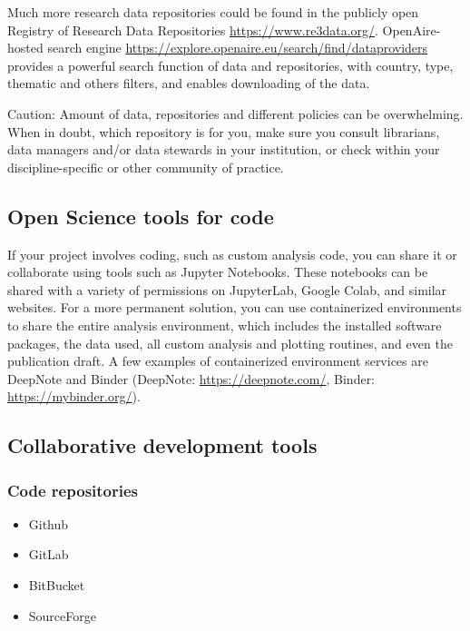 \documentclass[
  letterpaper,
  DIV=11,
  numbers=noendperiod]{scrreport}
\providecommand{\tightlist}{%
  \setlength{\itemsep}{0pt}\setlength{\parskip}{0pt}}\usepackage{longtable,booktabs,array}
\begin{document}
Much more research data repositories could be found in the publicly open
Registry of Research Data Repositories \url{https://www.re3data.org/}.
OpenAire-hosted search engine
\url{https://explore.openaire.eu/search/find/dataproviders} provides a
powerful search function of data and repositories, with country, type,
thematic and others filters, and enables downloading of the data.

Caution: Amount of data, repositories and different policies can be
overwhelming. When in doubt, which repository is for you, make sure you
consult librarians, data managers and/or data stewards in your
institution, or check within your discipline-specific or other community
of practice.

\hypertarget{open-science-tools-for-code}{%
\subsection{Open Science tools for
code}\label{open-science-tools-for-code}}

If your project involves coding, such as custom analysis code, you can
share it or collaborate using tools such as Jupyter Notebooks. These
notebooks can be shared with a variety of permissions on JupyterLab,
Google Colab, and similar websites. For a more permanent solution, you
can use containerized environments to share the entire analysis
environment, which includes the installed software packages, the data
used, all custom analysis and plotting routines, and even the
publication draft. A few examples of containerized environment services
are DeepNote and Binder (DeepNote: \url{https://deepnote.com/}, Binder:
\url{https://mybinder.org/}).

\hypertarget{collaborative-development-tools}{%
\subsection{Collaborative development
tools}\label{collaborative-development-tools}}

\hypertarget{code-repositories}{%
\subsubsection{Code repositories}\label{code-repositories}}

\begin{itemize}
\tightlist
\item
  Github
\item
  GitLab
\item
  BitBucket
\item
  SourceForge
\end{itemize}
\end{document}
